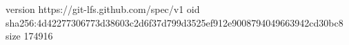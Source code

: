 version https://git-lfs.github.com/spec/v1
oid sha256:4d42277306773d38603c2d6f37d799d3525ef912e9008794049663942cd30bc8
size 174916
